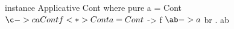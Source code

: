 \begin{code}
instance Applicative Cont where
  pure a = Cont $ \c -> c a
  Cont f <*> Cont a = Cont $ \br ->
    f $ \ab ->
      a $ br . ab
\end{code}

